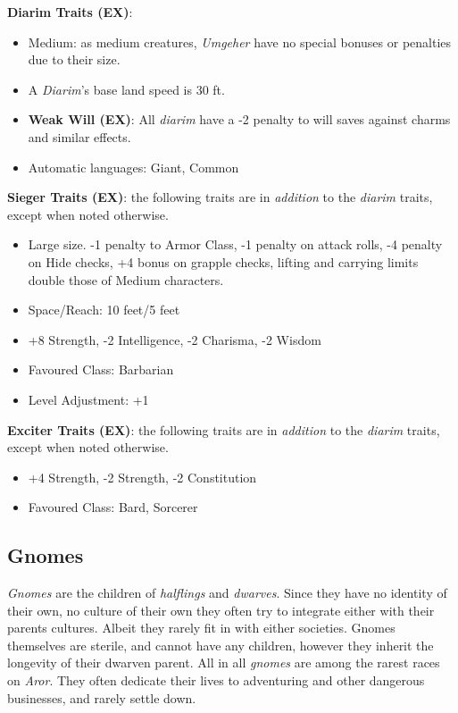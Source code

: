 \begin{35e}
  \textbf{Diarim Traits (EX)}:
  \begin{itemize}[noitemsep]
    \item Medium: as medium creatures, \emph{Umgeher} have no special bonuses or
    penalties due to their size.
    \item A \emph{Diarim}'s base land speed is 30 ft.
    \item \textbf{Weak Will (EX)}: All \emph{diarim} have a -2 penalty to will
    saves against charms and similar effects.
    \item Automatic languages: Giant, Common
  \end{itemize}

  \textbf{Sieger Traits (EX)}: the following traits are in \emph{addition} to
  the \emph{diarim} traits, except when noted otherwise.
  \begin{itemize}[noitemsep]
    \item Large size. -1 penalty to Armor Class, -1 penalty on attack rolls,
    -4 penalty on Hide checks, +4 bonus on grapple checks, lifting and
    carrying limits double those of Medium characters.
    \item Space/Reach: 10 feet/5 feet
    \item +8 Strength, -2 Intelligence, -2 Charisma, -2 Wisdom
    \item Favoured Class: Barbarian
    \item Level Adjustment: +1
  \end{itemize}

  \textbf{Exciter Traits (EX)}: the following traits are in \emph{addition} to
  the \emph{diarim} traits, except when noted otherwise.
  \begin{itemize}[noitemsep]
    \item +4 Strength, -2 Strength, -2 Constitution
    \item Favoured Class: Bard, Sorcerer
  \end{itemize}
\end{35e}

\subsection*{Gnomes}

\emph{Gnomes} are the children of \emph{halflings} and \emph{dwarves}. Since
they have no identity of their own, no culture of their own they often try to
integrate either with their parents cultures. Albeit they rarely fit in with
either societies. Gnomes themselves are sterile, and cannot have any children,
however they inherit the longevity of their dwarven parent. All in
all \emph{gnomes} are among the rarest races on \emph{Aror}. They often
dedicate their lives to adventuring and other dangerous businesses, and rarely
settle down.

